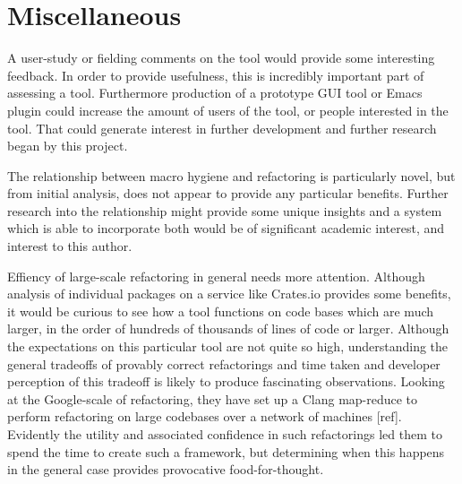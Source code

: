 \section{Miscellaneous}
A user-study or fielding comments on the tool would provide some interesting feedback. In order to provide usefulness, this is incredibly important part of assessing a tool. Furthermore production of a prototype GUI tool or Emacs plugin could increase the amount of users of the tool, or people interested in the tool. That could generate interest in further development and further research began by this project.

The relationship between macro hygiene and refactoring is particularly novel, but from initial analysis, does not appear to provide any particular benefits. Further research into the relationship might provide some unique insights and a system which is able to incorporate both would be of significant academic interest, and interest to this author.

Effiency of large-scale refactoring in general needs more attention. Although analysis of individual packages on a service like Crates.io provides some benefits, it would be curious to see how a tool functions on code bases which are much larger, in the order of hundreds of thousands of lines of code or larger. Although the expectations on this particular tool are not quite so high, understanding the general tradeoffs of provably correct refactorings and time taken and developer perception of this tradeoff is likely to produce fascinating observations. Looking at the Google-scale of refactoring, they have set up a Clang map-reduce to perform refactoring on large codebases over a network of machines [ref]. Evidently the utility and associated confidence in such refactorings led them to spend the time to create such a framework, but determining when this happens in the general case provides provocative food-for-thought.

